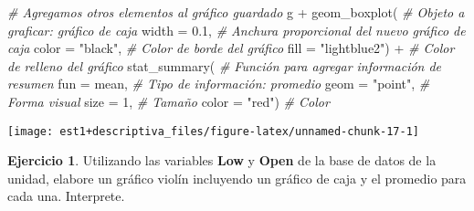 \documentclass[
]{book}
\newenvironment{Shaded}{\begin{snugshade}}{\end{snugshade}}
\newcommand{\AttributeTok}[1]{\textcolor[rgb]{0.77,0.63,0.00}{#1}}
\newcommand{\CommentTok}[1]{\textcolor[rgb]{0.56,0.35,0.01}{\textit{#1}}}
\newcommand{\DecValTok}[1]{\textcolor[rgb]{0.00,0.00,0.81}{#1}}
\newcommand{\FloatTok}[1]{\textcolor[rgb]{0.00,0.00,0.81}{#1}}
\newcommand{\FunctionTok}[1]{\textcolor[rgb]{0.00,0.00,0.00}{#1}}
\newcommand{\NormalTok}[1]{#1}
\newcommand{\SpecialCharTok}[1]{\textcolor[rgb]{0.00,0.00,0.00}{#1}}
\newcommand{\StringTok}[1]{\textcolor[rgb]{0.31,0.60,0.02}{#1}}
\theoremstyle{definition}
\theoremstyle{definition}
\theoremstyle{definition}
\newtheorem{exercise}{Ejercicio}[chapter]
\theoremstyle{definition}
\theoremstyle{remark}
\begin{document}
\begin{Shaded}
\begin{Highlighting}[]
\CommentTok{\# Agregamos otros elementos al gráfico guardado}
\NormalTok{g }\SpecialCharTok{+} \FunctionTok{geom\_boxplot}\NormalTok{( }\CommentTok{\# Objeto a graficar: gráfico de caja}
  \AttributeTok{width =} \FloatTok{0.1}\NormalTok{, }\CommentTok{\# Anchura proporcional del nuevo gráfico de caja}
  \AttributeTok{color =} \StringTok{"black"}\NormalTok{, }\CommentTok{\# Color de borde del gráfico}
  \AttributeTok{fill =} \StringTok{"lightblue2"}\NormalTok{) }\SpecialCharTok{+} \CommentTok{\# Color de relleno del gráfico}
  \FunctionTok{stat\_summary}\NormalTok{( }\CommentTok{\# Función para agregar información de resumen}
    \AttributeTok{fun =}\NormalTok{ mean, }\CommentTok{\# Tipo de información: promedio}
    \AttributeTok{geom =} \StringTok{"point"}\NormalTok{, }\CommentTok{\# Forma visual}
    \AttributeTok{size =} \DecValTok{1}\NormalTok{, }\CommentTok{\# Tamaño}
    \AttributeTok{color =} \StringTok{"red"}\NormalTok{) }\CommentTok{\# Color}
\end{Highlighting}
\end{Shaded}

\begin{center}\texttt{[image: est1+descriptiva\_files/figure-latex/unnamed-chunk-17-1]} \end{center}

\begin{exercise}
Utilizando las variables \textbf{Low} y \textbf{Open} de la base de datos de la unidad, elabore un gráfico violín incluyendo un gráfico de caja y el promedio para cada una. Interprete.
\end{exercise}
\end{document}
